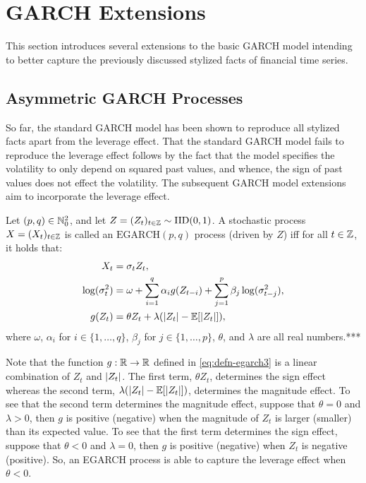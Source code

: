 \section{GARCH Extensions}
This section introduces several extensions to the basic GARCH model intending to better capture the previously discussed stylized facts of financial time series.
\subsection{Asymmetric GARCH Processes}\label{ss:asymmetric}
So far, the standard GARCH model has been shown to reproduce all stylized facts apart from the leverage effect. That the standard GARCH model fails to reproduce the leverage effect follows by the fact that the model specifies the volatility to only depend on squared past values, and whence, the sign of past values does not effect the volatility. The subsequent GARCH model extensions aim to incorporate the leverage effect.
\begin{defn}
Let $(p,q)\in\mathbb{N}_{0}^{2}$, and let $Z=(Z_{t})_{t\in\mathbb{Z}}\sim\mathrm{IID}(0,1)$. A stochastic process $X=(X_{t})_{t\in\mathbb{Z}}$ is called an $\mathrm{EGARCH}(p,q)$ process (driven by $Z$) iff for all $t\in\mathbb{Z}$, it holds that:
\begin{subequations}\label{eq:defn-egarch}
\begin{align}
    X_{t}&=\sigma_{t}Z_{t}, \label{eq:defn-egarch1}\\
    \log(\sigma_{t}^{2})&=\omega+\sum_{i=1}^{q}\alpha_{i}g(Z_{t-i})+\sum_{j=1}^{p}\beta_{j}\log(\sigma_{t-j}^{2})\label{eq:defn-egarch2},\\
    g(Z_{t})&=\theta Z_{t}+\lambda\left(\abs{Z_{t}}-\mathbb{E}\left[\abs{Z_{t}}\right]\right)\label{eq:defn-egarch3},
\end{align}
\end{subequations}
where $\omega$, $\alpha_{i}$ for $i\in\{1,\dots,q\}$, $\beta_{j}$ for $j\in\{1,\dots,p\}$, $\theta$, and $\lambda$ are all real numbers.***
\end{defn}
Note that the function $g:\mathbb{R}\to\mathbb{R}$ defined in \eqref{eq:defn-egarch3} is a linear combination of $Z_{t}$ and $\lvert Z_{t}\rvert$. The first term, $\theta Z_{t}$, determines the sign effect whereas the second term, $\lambda(\lvert Z_{t}\rvert-\mathbb{E}[\lvert Z_{t}\rvert])$, determines the magnitude effect. To see that the second term determines the magnitude effect, suppose that $\theta=0$ and $\lambda>0$, then $g$ is positive (negative) when the magnitude of $Z_{t}$ is larger (smaller) than its expected value. To see that the first term determines the sign effect, suppose that $\theta<0$ and $\lambda=0$, then $g$ is positive (negative) when $Z_{t}$ is negative (positive). So, an EGARCH process is able to capture the leverage effect when $\theta<0$.

